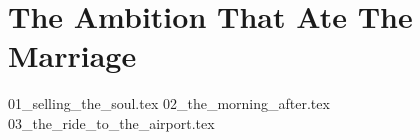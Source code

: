\section{The Ambition That Ate The Marriage}

{01_selling_the_soul.tex}
{02_the_morning_after.tex}
{03_the_ride_to_the_airport.tex}
